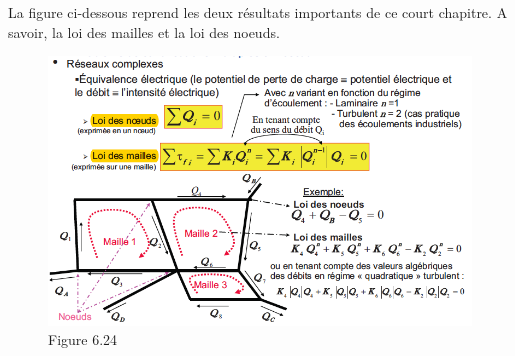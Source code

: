 La figure ci-dessous reprend les deux résultats importants de ce court chapitre. A savoir, la loi des mailles et la loi des noeuds.

\begin{figure}[H]
\begin{center}
\includegraphics[scale=0.5]{ch6/86.png}
\caption*{Figure 6.24}
\end{center}
\end{figure}
